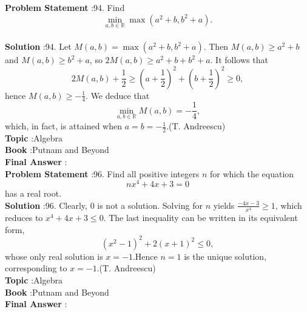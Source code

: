 \documentclass[10pt]{article}
\begin{document}
\textbf{Problem Statement} :94. Find$$ \min _{a, b \in \mathbb{R}} \max \left(a^{2}+b, b^{2}+a\right) . $$\\
\textbf{Solution} :94. Let $M(a, b)=\max \left(a^{2}+b, b^{2}+a\right)$. Then $M(a, b) \geq a^{2}+b$ and $M(a, b) \geq b^{2}+a$, so $2 M(a, b) \geq a^{2}+b+b^{2}+a$. It follows that$$ 2 M(a, b)+\frac{1}{2} \geq\left(a+\frac{1}{2}\right)^{2}+\left(b+\frac{1}{2}\right)^{2} \geq 0, $$hence $M(a, b) \geq-\frac{1}{4}$. We deduce that$$ \min _{a, b \in \mathbb{R}} M(a, b)=-\frac{1}{4}, $$which, in fact, is attained when $a=b=-\frac{1}{2}$.(T. Andreescu)\\
\textbf{Topic} :Algebra\\
\textbf{Book} :Putnam and Beyond\\
\textbf{Final Answer} :\\


\textbf{Problem Statement} :96. Find all positive integers $n$ for which the equation$$ n x^{4}+4 x+3=0 $$has a real root.\\
\textbf{Solution} :96. Clearly, 0 is not a solution. Solving for $n$ yields $\frac{-4 x-3}{x^{4}} \geq 1$, which reduces to $x^{4}+4 x+3 \leq 0$. The last inequality can be written in its equivalent form,$$ \left(x^{2}-1\right)^{2}+2(x+1)^{2} \leq 0, $$whose only real solution is $x=-1$.Hence $n=1$ is the unique solution, corresponding to $x=-1$.(T. Andreescu)\\
\textbf{Topic} :Algebra\\
\textbf{Book} :Putnam and Beyond\\
\textbf{Final Answer} :\\
\end{document}
